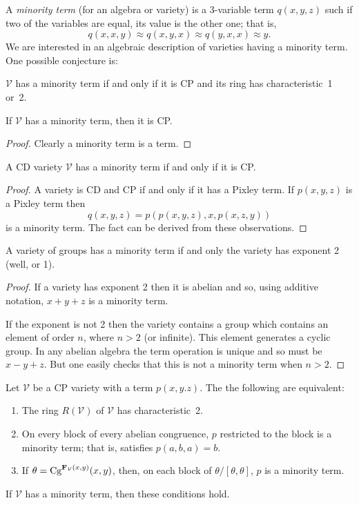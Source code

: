 A \emph{minority term} (for an algebra or variety) is a
3-variable term $q(x,y,z)$ such if two of the variables
are equal, its value is the other one; that is,
\[
q(x,x,y) \approx q(x,y,x) \approx q(y,x,x) \approx y.
\]
We are interested in an algebraic description of varieties having
a minority term. One possible conjecture is:
\begin{conjecture}
$\mathcal V$ has a minority term if and only if it is CP and its
ring has characteristic~1 or~2.
\end{conjecture}



\begin{fact}
If $\mathcal V$ has a minority term, then it is CP.
\end{fact}

\begin{proof}
Clearly a minority term is a \malcev term.
\end{proof}

\begin{fact}
A CD variety $\mathcal V$ has a minority term if and
only if it is CP.
\end{fact}

\begin{proof}
A variety is CD and CP if and only if it has a Pixley term.
If $p(x,y,z)$ is a Pixley term then
\[
q(x,y,z) = p(p(x,y,z),x,p(x,z,y))
\]
is a minority term. The fact can be derived from these
observations.
\end{proof}

\begin{fact}
A variety of groups has a minority term if and only
the variety has exponent 2 (well, or 1).
\end{fact}

\begin{proof}
If a variety has exponent 2 then it is abelian and so,
using additive notation, $x + y + z$ is a minority term.

If the exponent is not 2 then the variety contains a group
which contains an element of order $n$, where $n > 2$ (or
infinite). This element generates a cyclic group. In any
abelian algebra the \malcev term operation is unique and so
must be $x - y + z$. But one easily checks that this is not
a minority term when $n > 2$.
\end{proof}

\begin{lemma}
Let $\mathcal V$ be a CP variety with a \malcev term $p(x,y.z)$.
The the following are equivalent:
\begin{enumerate}
\item
The ring $R(\mathcal V)$ of $\mathcal V$ has characteristic~2.
\item
On every block of every abelian congruence, $p$ restricted to the
block is a minority term; that is, satisfies $p(a,b,a) = b$.
\item
If $\theta = \textup{Cg}^{\mathbf{F}_{\mathcal V}(x,y)}(x,y)$, then,
on each block of $\theta/[\theta,\theta]$, $p$ is a minority term.
\end{enumerate}
If $\mathcal V$ has a minority term, then these conditions hold.
\end{lemma}

